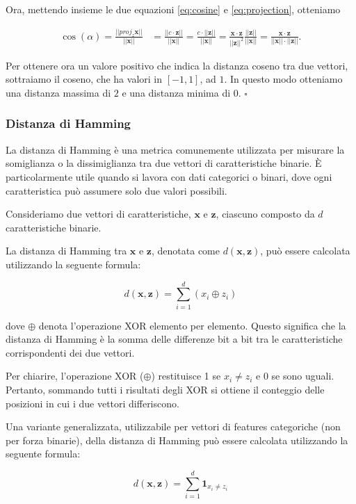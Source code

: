 Ora, mettendo insieme le due equazioni \eqref{eq:cosine} e \eqref{eq:projection}, otteniamo

\begin{align*}
\cos(\alpha) = \frac{||proj_z \mathbf x||}{||\mathbf x||} &= 
\frac{||c \cdot \mathbf z||}{||\mathbf x||} = \frac{c \cdot ||\mathbf z||}{||\mathbf x||}=
\frac{\mathbf x \cdot \mathbf z }{||\mathbf z||^2} \frac{||\mathbf z||}{||\mathbf x||}=
\frac{\mathbf x \cdot \mathbf z}{||\mathbf x|| \cdot ||\mathbf z||}.
\end{align*}

Per ottenere ora un valore positivo che indica la distanza coseno tra due vettori, sottraiamo il coseno,
che ha valori in $[-1, 1]$, ad $1$. In questo modo otteniamo una distanza massima di $2$ e una distanza minima
di $0$.
$\square$

\subsubsection{Distanza di Hamming}
La distanza di Hamming è una metrica comunemente utilizzata per misurare la somiglianza o la dissimiglianza tra due vettori di caratteristiche binarie. È particolarmente utile quando si lavora con dati categorici o binari, dove ogni caratteristica può assumere solo due valori possibili.

Consideriamo due vettori di caratteristiche, $\mathbf{x}$ e $\mathbf{z}$, 
ciascuno composto da $d$ caratteristiche binarie.

La distanza di Hamming tra $\mathbf{x}$ e $\mathbf{z}$, denotata come $d(\mathbf{x}, \mathbf{z})$, può essere calcolata utilizzando la seguente formula:

\[
d(\mathbf{x}, \mathbf{z}) = \sum_{i=1}^{d} (x_i \oplus z_i)
\]

dove $\oplus$ denota l'operazione XOR elemento per elemento. Questo significa che la distanza di Hamming è la somma delle differenze bit a bit tra le caratteristiche corrispondenti dei due vettori.

Per chiarire, l'operazione XOR ($\oplus$) restituisce 1 se $x_i \neq z_i$ e 0 se sono uguali. 
Pertanto, sommando tutti i risultati degli XOR si ottiene il conteggio delle posizioni in cui i due vettori differiscono.

Una variante generalizzata, utilizzabile per vettori di features categoriche (non per forza binarie), 
della distanza di Hamming può essere calcolata utilizzando la seguente formula:

\[
d(\mathbf{x}, \mathbf{z}) = \sum_{i=1}^{d} \mathbf 1_{x_i \neq z_i}
\]

